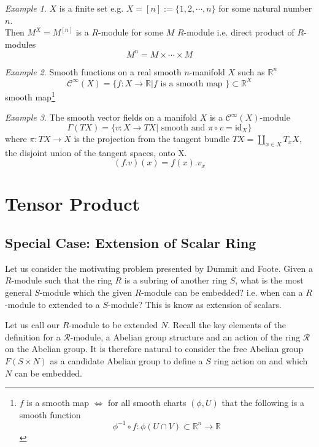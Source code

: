 \documentclass{article}
\theoremstyle{plain}
\theoremstyle{definition}
\theoremstyle{remark}
\newtheorem{eg}{Example}[section]
\begin{document}
  \begin{eg}
    $X$ is a finite set e.g. $X=[n]:=\{1,2,\cdots,n\}$ for some 
    natural number $n$.
    \\[1em]
    Then $M^X=M^{[n]}$ is a $R$-module for some 
    $M$ $R$-module i.e. direct product of $R$-modules 
    \[M^n=M\times \cdots\times M\]
  \end{eg}
  \begin{eg}
    Smooth functions on a real smooth $n$-manifold $X$ such as $\mathbb{R}^n$
    \[\mathcal{C}^\infty(X)=\{f:X\to\mathbb{R} | f\text{ is a smooth map
    }\}\subset\mathbb{R}^X\]
    smooth map\footnote{
      $f$ is a smooth map $\iff$ for all smooth charts $(\phi,U)$ that 
      the following is a smooth function
      \[\phi^{-1}\circ f:\phi(U\cap V)\subset\mathbb{R}^n\to\mathbb{R}\] 
    } 
  \end{eg}
  \begin{eg}
    The smooth vector fields on a manifold $X$ is a 
    $\mathcal{C}^\infty(X)$-module
    \[ \Gamma(TX)=\{v:X\to TX |\text{ smooth and }\pi\circ v=\text{id}_X\}\]
    where $\pi:TX\to X$ is the projection from the tangent bundle
    $TX=\amalg_{x\in X}T_xX$, the disjoint union of the tangent spaces, onto X.
    \[ (f.v)(x)=f(x).v_x \]
  \end{eg}
\section{Tensor Product}
\subsection{Special Case: Extension of Scalar Ring}
  Let us consider the motivating problem presented by Dummit and Foote. Given
  a $R$-module such that the ring $R$ is a subring of another ring $S$, what is the most
  general $S$-module which the given $R$-module can be embedded? i.e. when can
  a $R$-module to extended to a $S$-module? This is know as extension of 
  scalars.

  Let us call our $R$-module to be extended $N$.
  Recall the key elements of the definition for a $\mathcal{R}$-module, a Abelian group
  structure and an action of the ring $\mathcal{R}$ on the Abelian group.
  It is therefore natural to consider the free Abelian group $F(S\times N)$
  as a candidate Abelian group to define a $S$ ring action on and which $N$
  can be embedded.
\end{document}
